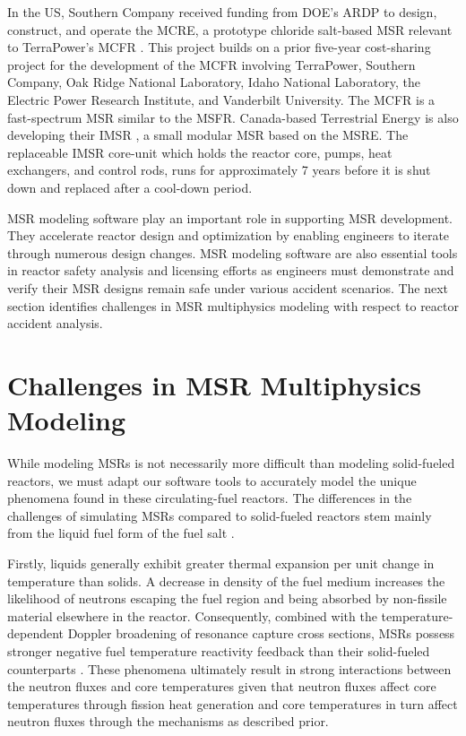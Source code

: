 In the US, Southern Company received funding from \gls{DOE}'s
\gls{ARDP} \cite{doe_office_2021} to design, construct, and operate the
\gls{MCRE}, a prototype chloride salt-based \gls{MSR} relevant to TerraPower's
\gls{MCFR} \cite{terrapower_mcfr_2020}. This project builds on a prior
five-year cost-sharing project for the development of the \gls{MCFR} involving
TerraPower, Southern Company, Oak Ridge National Laboratory, Idaho National
Laboratory, the Electric Power Research Institute, and Vanderbilt University.
The \gls{MCFR} is a fast-spectrum \gls{MSR} similar to the \gls{MSFR}.
Canada-based Terrestrial Energy is also developing their \gls{IMSR}
\cite{leblanc_18_2017}, a small modular \gls{MSR} based on the \gls{MSRE}. The
replaceable \gls{IMSR} core-unit which holds the reactor core, pumps, heat
exchangers, and control rods, runs for approximately 7 years before it is shut
down and replaced after a cool-down period.

\gls{MSR} modeling software play an important role in supporting
\gls{MSR} development. They accelerate reactor design and optimization by
enabling engineers to iterate through numerous design changes. \gls{MSR}
modeling software are also essential tools in reactor safety analysis and
licensing efforts as engineers must demonstrate and verify their \gls{MSR}
designs remain safe under various accident scenarios. The next section
identifies challenges in \gls{MSR} multiphysics modeling with respect to
reactor accident analysis.

\section{Challenges in MSR Multiphysics Modeling} \label{sec:challenges}

While modeling \glspl{MSR} is not necessarily more difficult than modeling
solid-fueled reactors, we must adapt our software tools to accurately model the
unique phenomena found in these circulating-fuel reactors. The differences in
the challenges of simulating \glspl{MSR} compared to solid-fueled reactors stem
mainly from the liquid fuel form of the fuel salt \cite{huff_identifying_2019,
diamond_phenomena_2018}.

Firstly, liquids generally exhibit greater thermal
expansion per unit change in temperature than solids. A decrease in density of
the fuel medium increases the likelihood of neutrons escaping the fuel region
and being absorbed by non-fissile material elsewhere in the reactor.
Consequently, combined with the temperature-dependent Doppler broadening of
resonance capture cross sections, \glspl{MSR} possess stronger negative fuel
temperature reactivity feedback than their solid-fueled counterparts
\cite{elsheikh_safety_2013}. These
phenomena ultimately result in strong interactions between the neutron fluxes
and core temperatures given that neutron fluxes affect core temperatures
through fission heat generation and core temperatures in turn affect neutron
fluxes through the mechanisms as described prior.

